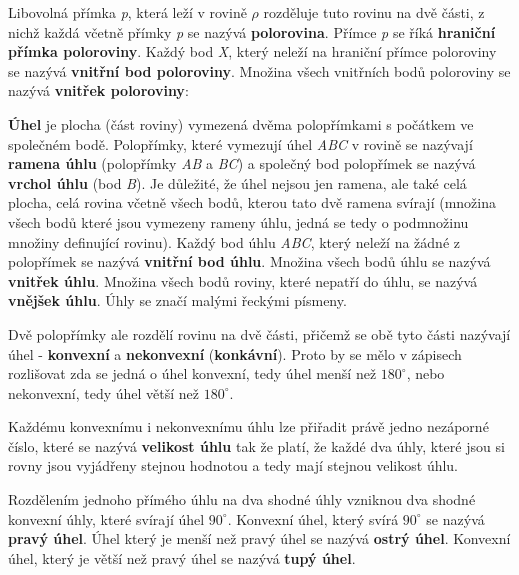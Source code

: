 Libovolná přímka {\it p}, která leží v rovině $\rho$ rozděluje tuto rovinu na dvě části, z nichž každá včetně přímky {\it p} se nazývá {\bf polorovina}. Přímce {\it p} se říká {\bf hraniční přímka poloroviny}. Každý bod {\it X}, který neleží na hraniční přímce poloroviny se nazývá {\bf vnitřní bod poloroviny}. Množina všech vnitřních bodů poloroviny se nazývá {\bf vnitřek poloroviny}:

\vskip 4mm
\centerline{}
\vskip 4mm



{\bf Úhel} je plocha (část roviny) vymezená dvěma polopřímkami s počátkem ve společném bodě. Polopřímky, které vymezují úhel {\it ABC} v rovině se nazývají {\bf ramena úhlu} (polopřímky {\it AB} a {\it BC}) a společný bod polopřímek se nazývá {\bf vrchol úhlu} (bod {\it B}). Je důležité, že úhel nejsou jen ramena, ale také celá plocha, celá rovina včetně všech bodů, kterou tato dvě ramena svírají (množina všech bodů které jsou vymezeny rameny úhlu, jedná se tedy o podmnožinu množiny definující rovinu). Každý bod úhlu {\it ABC}, který neleží na žádné z polopřímek se nazývá {\bf vnitřní bod úhlu}. Množina všech bodů úhlu se nazývá {\bf vnitřek úhlu}. Množina všech bodů roviny, které nepatří do úhlu, se nazývá {\bf vnějšek úhlu}. Úhly se značí malými řeckými písmeny.

\vskip 4mm
\centerline{}
\vskip 4mm

Dvě polopřímky ale rozdělí rovinu na dvě části, přičemž se obě tyto části nazývají úhel - {\bf konvexní} a {\bf nekonvexní} ({\bf konkávní}). Proto by se mělo v zápisech rozlišovat zda se jedná o úhel konvexní, tedy úhel menší než $180^\circ$, nebo nekonvexní, tedy úhel větší než $180^\circ$.

\vskip 4mm
\centerline{}
\vskip 4mm


Každému konvexnímu i nekonvexnímu úhlu lze přiřadit právě jedno nezáporné číslo, které se nazývá {\bf velikost úhlu} tak že platí, že každé dva úhly, které jsou si rovny jsou vyjádřeny stejnou hodnotou a tedy mají stejnou velikost úhlu.

Rozdělením jednoho přímého úhlu na dva shodné úhly vzniknou dva shodné konvexní úhly, které svírají úhel $90^\circ$. Konvexní úhel, který svírá $90^\circ$ se nazývá {\bf pravý úhel}. Úhel který je menší než pravý úhel se nazývá {\bf ostrý úhel}. Konvexní úhel, který je větší než pravý úhel se nazývá {\bf tupý úhel}. 


